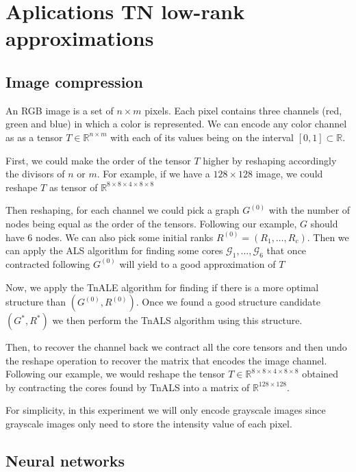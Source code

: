 \documentclass[11pt,a4paper,openright,oneside]{book}
\numberwithin{equation}{section}
\begin{document}
{\chapter{Aplications TN low-rank approximations}

\section{Image compression}

An RGB image is a set of $n \times m$ pixels. Each pixel contains
three channels (red, green and blue) in which a color is represented. 
We can encode any color channel as
as a tensor $T \in \mathbb{R}^{n \times m}$ with each of its values
being on the interval $[0,1] \subset \mathbb{R}$.

First, we could make the order of the tensor $T$ higher by reshaping accordingly the divisors of $n$ or $m$. For example,
if we have a $128 \times 128$ image, we could reshape $T$ as tensor of $\mathbb{R}^{8 \times 8 \times 4 \times 8 \times 8 }$

Then reshaping, for each channel we could pick a graph $G^{(0)}$ with the number of nodes being equal as the order of the tensors. Following our example,
$G$ should have $6$ nodes. We can also pick some initial ranks $R^{(0)} = (R_1, \dots, R_c)$. Then we can apply the ALS algorithm for
finding some cores $\mathcal{G}_1, \dots, \mathcal{G}_6$ that once contracted following $G^{(0)}$ will yield to a good approximation
of $T$

Now, we apply the \gls{TnALE} algorithm for finding if there is a more optimal structure than $(G^{(0)}, R^{(0)})$. Once we found a good
structure candidate $(G^*, R^*)$ we then perform the TnALS algorithm using this structure.

Then, to recover the channel back we contract all the core tensors and then undo the reshape operation to recover the matrix that
encodes the image channel. Following our example, we would reshape the tensor $T \in \mathbb{R}^{ 8 \times 8 \times 4 \times 8 \times 8}$
obtained by contracting the cores found by TnALS into a matrix of $\mathbb{R}^{128 \times 128}$.

For simplicity, in this experiment we will only encode grayscale images since grayscale images
only need to store the intensity value of each pixel. 

\section{Neural networks}


}
\end{document}

